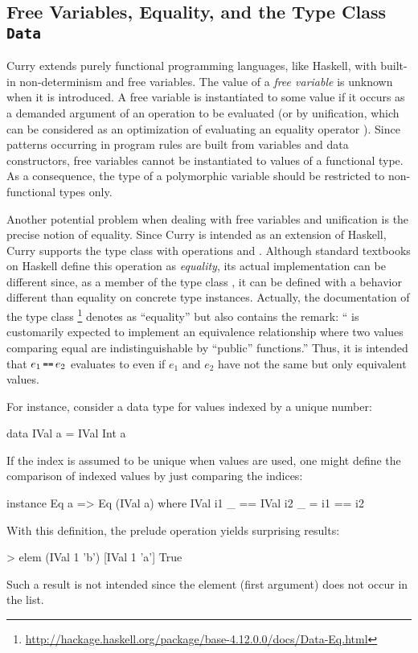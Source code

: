 \subsection{Free Variables, Equality, and the Type Class \texttt{Data}}

Curry extends purely functional programming languages, like Haskell,
with built-in non-determinism and free variables.
The value of a \emph{free variable}
is unknown when it is introduced.
A free variable is instantiated to some value if it occurs
as a demanded argument of an operation to be evaluated
(or by unification, which can be considered
as an optimization of evaluating an equality operator \cite{AntoyHanus17FAoC}).
Since patterns occurring in program rules are built from
variables and data constructors, free variables cannot be
instantiated to values of a functional type.
As a consequence, the type of a polymorphic variable
should be restricted to non-functional types only.

Another potential problem when dealing with free variables
and unification is the precise notion of equality.
Since Curry is intended as an extension of Haskell,
Curry supports the type class  with operations
\ccode{==} and \ccode{/=}.
Although standard textbooks on Haskell define this operation
as \emph{equality},
its actual implementation can be different since, as a member of the
type class , it can be defined with a behavior
different than equality on concrete type instances.
Actually, the documentation of the type class \footnote{%
\url{http://hackage.haskell.org/package/base-4.12.0.0/docs/Data-Eq.html}}
denotes \ccode{==} as ``equality'' but also contains the remark:
``\code{==} is customarily expected to implement an equivalence
relationship where two values comparing equal are indistinguishable
by ``public'' functions.''
Thus, it is intended that $e_1 \seq e_2$ evaluates to 
even if $e_1$ and $e_2$ have not the same but only equivalent values.

For instance, consider a data type for values indexed by a unique
number:
%
\begin{curry}
data IVal a = IVal Int a
\end{curry}
%
If the index is assumed to be unique when  values are used,
one might define the comparison
of indexed values by just comparing the indices:
%
\begin{curry}
instance Eq a => Eq (IVal a) where
  IVal i1 _ == IVal i2 _  =  i1 == i2
\end{curry}
%
With this definition, the prelude operation 
yields surprising results:
%
\begin{curry}
> elem (IVal 1 'b') [IVal 1 'a']
True
\end{curry}
%
Such a result is not intended since the element (first argument)
does not occur in the list.

